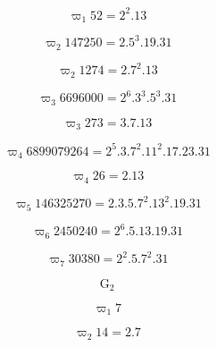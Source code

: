 \[
\varpi_ {1} 52 = 2 ^ {2}.13
\]

\[
\varpi_ {2} 147250 = 2.5 ^ {3}.19.31
\]

\[
\varpi_ {2} 1274 = 2.7 ^ {2}.13
\]

\[
\varpi_ {3} 6696000 = 2 ^ {6}.3 ^ {3}.5 ^ {3}.31
\]

\[
\varpi_ {3} 273 = 3.7.13
\]

\[
\varpi_ {4} 6899079264 = 2 ^ {5}.3.7 ^ {2}.11 ^ {2}.17.23.31
\]

\[
\varpi_ {4} 26 = 2.13
\]

\[
\varpi_ {5} 146325270 = 2.3.5.7 ^ {2}.13 ^ {2}.19.31
\]

\[
\varpi_ {6} 2450240 = 2 ^ {6}.5.13.19.31
\]

\[
\varpi_ {7} 30380 = 2 ^ {2}.5.7 ^ {2}.31
\]

\[
\mathrm{G} _ {2}
\]

\[
\varpi_ {1} 7
\]

\[
\varpi_ {2} 14 = 2.7
\]

